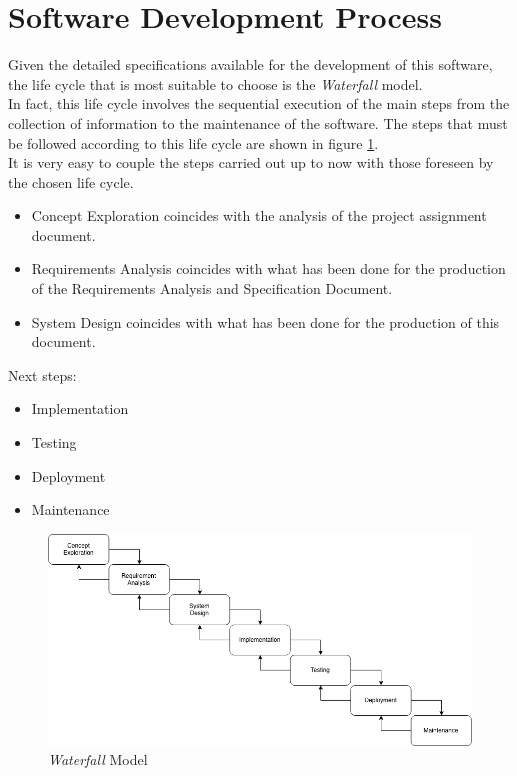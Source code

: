 \section{Software Development Process}
Given the detailed specifications available for the development of this software, the life cycle that is most suitable to choose is the \textit{Waterfall} model.\\
In fact, this life cycle involves the sequential execution of the main steps from the collection of information to the maintenance of the software.
The steps that must be followed according to this life cycle are shown in figure \ref{img:waterfall}.\\
It is very easy to couple the steps carried out up to now with those foreseen by the chosen life cycle.
\begin{itemize}
  \item Concept Exploration coincides with the analysis of the project assignment document.
  \item Requirements Analysis coincides with what has been done for the production of the Requirements Analysis and Specification Document.
  \item System Design coincides with what has been done for the production of this document.
\end{itemize}
Next steps:
\begin{itemize}
  \item Implementation
  \item Testing
  \item Deployment
  \item Maintenance
\end{itemize}

\begin{figure}[H]
  \begin{center}
  	\includegraphics[width=0.69\paperwidth]{./img/waterfall.png}
    \hspace{0.05\linewidth}
    \centering
    \caption{\textit{Waterfall} Model}
		\label{img:waterfall}
    \end{center}
\end{figure}

